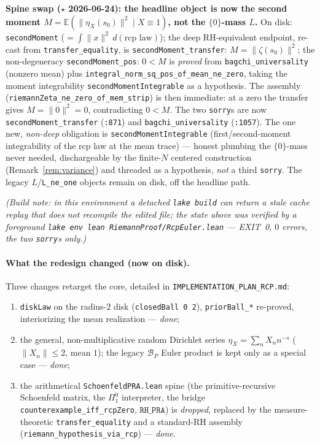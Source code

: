 \documentclass[11pt,a4paper]{article}
\theoremstyle{definition}
\newcommand{\etaX}{\eta_X}
\begin{document}
\textbf{Spine swap (\(\star\) 2026-06-24): the headline object is now the second moment
\(M=\mathbb{E}(\|\etaX(s_0)\|^2\mid X\equiv1)\), not the \(\{0\}\)-mass \(L\).} On disk:
\texttt{secondMoment} (\(=\int\|x\|^2\,d(\text{rcp law})\)); the deep RH-equivalent endpoint, re-cast from
\texttt{transfer\_equality}, is \texttt{secondMoment\_transfer}: \(M=\|\zeta(s_0)\|^2\); the non-degeneracy
\texttt{secondMoment\_pos}: \(0<M\) is \emph{proved} from \texttt{bagchi\_universality} (nonzero mean) plus
\texttt{integral\_norm\_sq\_pos\_of\_mean\_ne\_zero}, taking the moment integrability
\texttt{secondMomentIntegrable} as a hypothesis. The assembly
(\texttt{riemannZeta\_ne\_zero\_of\_mem\_strip}) is then immediate: at a zero the transfer gives
\(M=\|0\|^2=0\), contradicting \(0<M\). The two \texttt{sorry}s are now
\texttt{secondMoment\_transfer} (\texttt{:871}) and \texttt{bagchi\_universality} (\texttt{:1057}). The one
new, \emph{non-deep} obligation is \texttt{secondMomentIntegrable} (first/second-moment integrability of
the rcp law at the mean trace) --- honest plumbing the \(\{0\}\)-mass never needed, dischargeable by the
finite-\(N\) centered construction (Remark~\ref{rem:variance}) and threaded as a hypothesis, \emph{not} a
third \texttt{sorry}. The legacy \(L\)/\texttt{L\_ne\_one} objects remain on disk, off the headline path.

\emph{(Build note: in this environment a detached \texttt{lake build} can return a stale cache
replay that does not recompile the edited file; the state above was verified by a foreground
\texttt{lake env lean RiemannProof/RcpEuler.lean} --- EXIT~0, \(0\) errors, the two
\texttt{sorry}s only.)}

\paragraph{What the redesign changed (now on disk).} Three changes retarget the core, detailed in
\texttt{IMPLEMENTATION\_PLAN\_RCP.md}:
\begin{enumerate}
  \item[\textbf{(R)}] \texttt{diskLaw} on the radius-\(2\) disk (\texttt{closedBall 0 2}),
        \texttt{priorBall\_*} re-proved, interiorizing the mean realization --- \emph{done};
  \item[\textbf{(M)}] the general, non-multiplicative random Dirichlet series
        \(\etaX=\sum_n X_n n^{-s}\) (\(\|X_n\|\le2\), mean \(1\)); the legacy \(\mathcal{B}_P\)
        Euler product is kept only as a special case --- \emph{done};
  \item[\textbf{(Z)}] the arithmetical \texttt{SchoenfeldPRA.lean} spine (the primitive-recursive
        Schoenfeld matrix, the \(\Pi^0_1\) interpreter, the bridge
        \texttt{counterexample\_iff\_rcpZero}, \(\texttt{RH\_PRA}\)) is \emph{dropped}, replaced by
        the measure-theoretic \texttt{transfer\_equality} and a standard-RH assembly
        (\texttt{riemann\_hypothesis\_via\_rcp}) --- \emph{done}.
\end{enumerate}
\end{document}
